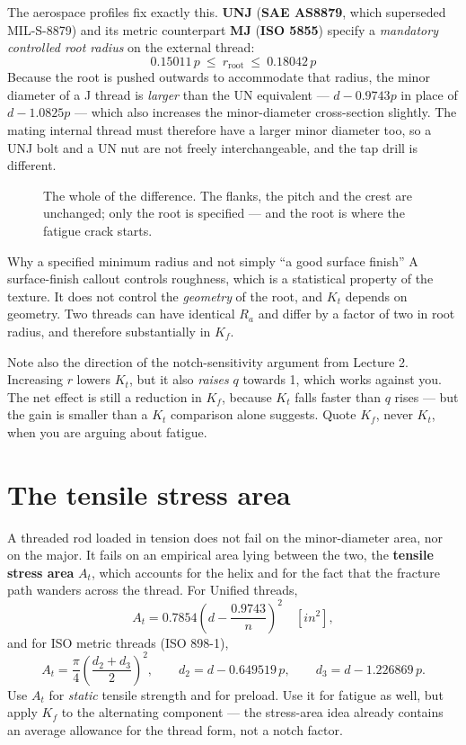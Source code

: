 \documentclass[11pt,a4paper]{article}
\begin{document}
The aerospace profiles fix exactly this. \textbf{UNJ} (\textbf{SAE AS8879}, which superseded
MIL-S-8879) and its metric counterpart \textbf{MJ} (\textbf{ISO 5855}) specify a \emph{mandatory
controlled root radius} on the external thread:
\[
\boxed{\,0.15011\,p \ \le\ r_{\text{root}} \ \le\ 0.18042\,p\,}
\]
Because the root is pushed outwards to accommodate that radius, the minor diameter of a J thread is
\emph{larger} than the UN equivalent --- $d - 0.9743p$ in place of $d - 1.0825p$ --- which also
increases the minor-diameter cross-section slightly. The mating internal thread must therefore have a
larger minor diameter too, so a UNJ bolt and a UN nut are not freely interchangeable, and the tap drill
is different.

\begin{figure}[H]\centering

\caption{The whole of the difference. The flanks, the pitch and the crest are unchanged; only the root
is specified --- and the root is where the fatigue crack starts.}
\end{figure}

\begin{aerobox}{Why a specified minimum radius and not simply ``a good surface finish''}
A surface-finish callout controls roughness, which is a statistical property of the texture. It does
not control the \emph{geometry} of the root, and $K_t$ depends on geometry. Two threads can have
identical $R_a$ and differ by a factor of two in root radius, and therefore substantially in $K_f$.

Note also the direction of the notch-sensitivity argument from Lecture 2. Increasing $r$ lowers $K_t$,
but it also \emph{raises} $q$ towards 1, which works against you. The net effect is still a reduction in
$K_f$, because $K_t$ falls faster than $q$ rises --- but the gain is smaller than a $K_t$ comparison
alone suggests. Quote $K_f$, never $K_t$, when you are arguing about fatigue.
\end{aerobox}

\section{The tensile stress area}

A threaded rod loaded in tension does not fail on the minor-diameter area, nor on the major. It fails
on an empirical area lying between the two, the \textbf{tensile stress area} $A_t$, which accounts for
the helix and for the fact that the fracture path wanders across the thread. For Unified threads,
\[
A_t = 0.7854\left(d - \frac{0.9743}{n}\right)^{2}\quad [\si{in^2}],
\]
and for ISO metric threads (ISO 898-1),
\[
A_t = \frac{\pi}{4}\left(\frac{d_2 + d_3}{2}\right)^{2},
\qquad d_2 = d - 0.649519\,p,\qquad d_3 = d - 1.226869\,p .
\]
Use $A_t$ for \emph{static} tensile strength and for preload. Use it for fatigue as well, but apply
$K_f$ to the alternating component --- the stress-area idea already contains an average allowance for
the thread form, not a notch factor.
\end{document}
